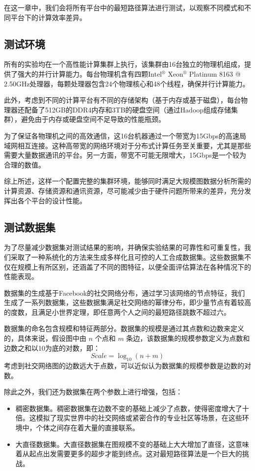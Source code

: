 在这一章中，我们会将所有平台中的最短路径算法进行测试，以观察不同模式和不同平台下的计算效率差异。

\subsection{测试环境}

所有的实验均在一个高性能计算集群上执行，该集群由16台独立的物理机组成，提供了强大的并行计算能力。每台物理机含有四颗Intel$^\circledR$ Xeon$^\circledR$ Platinum 8163 @ 2.50GHz处理器，每颗处理器包含24个物理核心和48个线程，确保并行计算能力。

此外，考虑到不同的计算平台有不同的存储架构（基于内存或基于磁盘），每台物理器还配备了512GB的DDR4内存和3TB的硬盘空间（通过Hadoop组成存储集群），避免由于内存或硬盘空间不足导致的性能瓶颈。

为了保证各物理机之间的高效通信，这16台机器通过一个带宽为15Gbps的高速局域网相互连接。这种高带宽的网络环境对于分布式计算任务至关重要，尤其是那些需要大量数据通讯的平台。另一方面，带宽不可能无限增大，15Gbps是一个较为合理的数值。

综上所述，这样一个配置完整的集群环境，能够同时满足大规模图数据分析所需的计算资源、存储资源和通讯资源，尽可能减少由于硬件问题所带来的差异，充分发挥出各个平台的设计性能。

\subsection{测试数据集}

为了尽量减少数据集对测试结果的影响，并确保实验结果的可靠性和可重复性，我们采取了一种系统化的方法来生成多样化且可控的人工合成数据集。这些数据集不仅在规模上有所区别，还涵盖了不同的图特征，以便全面评估算法在各种情况下的性能表现。

数据集的生成基于Facebook的社交网络分布，通过学习该网络的节点特征，我们生成了一系列数据集，这些数据集满足社交网络的幂律分布，即少量节点有着较高的度数，且满足小世界定理，即任意两个人之间的最短路径跳数不超过六。

数据集的命名包含规模和特征两部分。数据集的规模是通过其点数和边数来定义的，具体来说，假设图中由 $n$ 个点和 $m$ 条边，该数据集的规模参数定义为点数和边数之和以10为底的对数，即：
\begin{equation*}
    Scale = \log_{10}(n + m)
\end{equation*}
考虑到社交网络图的边数远大于点数，可以近似认为数据集的规模参数是边数的对数。

除此之外，我们还为数据集在两个参数上进行增强，包括：
\begin{itemize}
    \item 稠密数据集。稠密数据集在边数不变的基础上减少了点数，使得密度增大了十倍。这模拟了现实世界中的社交网络或紧密合作的专业社区等场景，在这些环境中，个体之间存在着大量的直接联系。
    \item 大直径数据集。大直径数据集在图规模不变的基础上大大增加了直径，这意味着从起点出发需要更多的超步才能到终点。这对最短路径算法是一个巨大的挑战。
\end{itemize}

